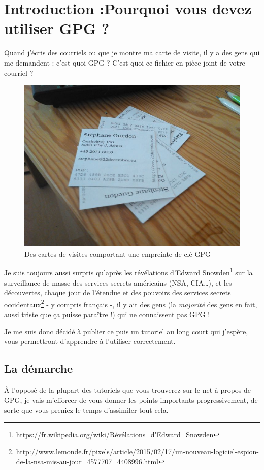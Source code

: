 \chapter{Introduction :Pourquoi vous devez utiliser GPG ?}

Quand j'écris des courriels ou que je montre ma carte de visite, il y a
des gens qui me demandent : c'est quoi GPG ? C'est quoi ce fichier en
pièce joint de votre courriel ?

\begin{figure}[h]
\centering
\includegraphics[width=0.7\linewidth]{images/visiting.jpeg}
\caption{Des cartes de visites comportant une empreinte de clé GPG}
\end{figure}

Je suis toujours aussi surpris qu'après les révélations d'Edward 
Snowden\footnote{\url{https://fr.wikipedia.org/wiki/Révélations_d'Edward_Snowden}} sur la surveillance de masse des services secrets américains (NSA, CIA\ldots{}), et les découvertes, chaque jour de l'étendue et des pouvoirs des services secrets occidentaux\footnote{\url{http://www.lemonde.fr/pixels/article/2015/02/17/un-nouveau-logiciel-espion-de-la-nsa-mis-au-jour_4577707_4408996.html}} - y compris français -, il y ait des gens (la \emph{majorité} des gens en fait, aussi triste que ça puisse
paraître !) qui ne connaissent pas GPG !

Je me suis donc décidé à publier ce puis un tutoriel au long court qui j'espère, vous permettront d'apprendre à l'utiliser correctement.

\section{La démarche}\label{la-duxe9marche}

À l'opposé de la plupart des tutoriels que vous trouverez sur le net à
propos de GPG, je vais m'efforcer de vous donner les points importants
progressivement, de sorte que vous preniez le temps d'assimiler tout
cela.

